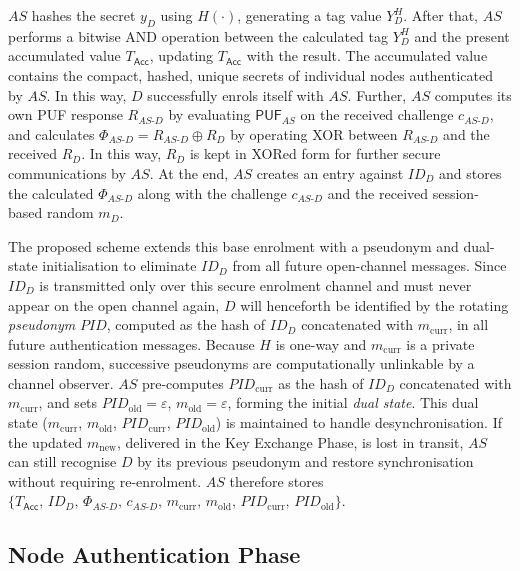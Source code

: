 \documentclass[conference]{IEEEtran}
\begin{document}
$AS$ hashes the secret $y_D$ using $H(\cdot)$, generating a tag
value $Y_D^H$.  After that, $AS$ performs a bitwise AND operation
between the calculated tag $Y_D^H$ and the present accumulated value $T_\mathsf{Acc}$,
updating $T_\mathsf{Acc}$ with the result.
The accumulated value contains the compact, hashed, unique secrets of individual
nodes authenticated by $AS$.  In this way, $D$ successfully enrols itself with
$AS$.  Further, $AS$ computes its own PUF response $R_{AS\text{-}D}$
by evaluating $\mathsf{PUF}_{AS}$ on the received challenge $c_{AS\text{-}D}$, and calculates
$\Phi_{AS\text{-}D} = R_{AS\text{-}D} \oplus R_D$ by operating XOR between
$R_{AS\text{-}D}$ and the received $R_D$.  In this way, $R_D$ is kept in XORed
form for further secure communications by $AS$.  At the end, $AS$ creates an
entry against $ID_D$ and stores the calculated $\Phi_{AS\text{-}D}$ along with
the challenge $c_{AS\text{-}D}$ and the received session-based random $m_D$.

The proposed scheme extends this base enrolment with a pseudonym and dual-state
initialisation to eliminate $ID_D$ from all future open-channel messages.  Since
$ID_D$ is transmitted only over this secure enrolment channel and must never
appear on the open channel again, $D$ will henceforth be identified by the
rotating \emph{pseudonym} $\mathit{PID}$, computed as the hash of $ID_D$ concatenated with $m_{\mathrm{curr}}$, in all
future authentication messages.  Because $H$ is one-way and $m_{\mathrm{curr}}$
is a private session random, successive pseudonyms are computationally unlinkable
by a channel observer.  $AS$ pre-computes
$\mathit{PID}_{\mathrm{curr}}$ as the hash of $ID_D$ concatenated with $m_{\mathrm{curr}}$, and sets
$\mathit{PID}_{\mathrm{old}} = \varepsilon$, $m_{\mathrm{old}} = \varepsilon$, forming the
initial \emph{dual state}.  This dual state
($m_{\mathrm{curr}}$, $m_{\mathrm{old}}$, $\mathit{PID}_{\mathrm{curr}}$,
$\mathit{PID}_{\mathrm{old}}$) is maintained to handle desynchronisation.  If the
updated $m_{\mathrm{new}}$, delivered in the Key Exchange Phase, is lost in
transit, $AS$ can still recognise $D$ by its previous pseudonym and restore
synchronisation without requiring re-enrolment.  $AS$ therefore stores
$\{T_\mathsf{Acc},\, ID_D,\, \Phi_{AS\text{-}D},\, c_{AS\text{-}D},\,
m_{\mathrm{curr}},\, m_{\mathrm{old}},\, \mathit{PID}_{\mathrm{curr}},\,
\mathit{PID}_{\mathrm{old}}\}$.

\subsection{Node Authentication Phase}
\end{document}
